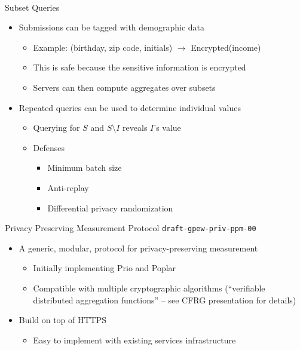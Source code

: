 \documentclass[helvetica]{beamer}
\begin{document}
\begin{frame}{Subset Queries}

  \begin{itemize}
  \item Submissions can be tagged with demographic data
    \begin{itemize}
    \item Example: (birthday, zip code, initials) $\rightarrow$ Encrypted(income)
    \item This is safe because the sensitive information is encrypted      
    \item Servers can then compute aggregates over subsets
    \end{itemize}

  \item Repeated queries can be used to determine individual values
    \begin{itemize}
    \item Querying for $S$ and $S \setminus I$ reveals $I$'s value
    \item Defenses
      \begin{itemize}
      \item Minimum batch size
      \item Anti-replay
      \item Differential privacy randomization
      \end{itemize}
    \end{itemize}
  \end{itemize}
\end{frame}


\begin{frame}{Privacy Preserving Measurement Protocol}
  {\texttt{draft-gpew-priv-ppm-00}}

  \begin{itemize}
  \item A generic, modular, protocol for privacy-preserving measurement
    \begin{itemize}
    \item Initially implementing Prio and Poplar      
    \item Compatible with multiple cryptographic algorithms (``verifiable distributed aggregation functions'' -- see CFRG presentation for details)
    \end{itemize}

  \item Build on top of HTTPS
    \begin{itemize}
    \item Easy to implement with existing services infrastructure
    \end{itemize}
  \end{itemize}
\end{frame}
\end{document}
